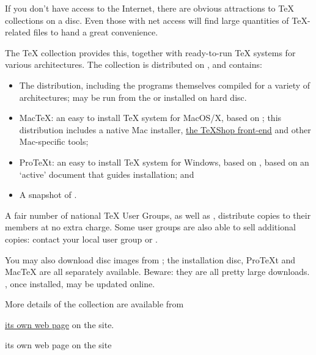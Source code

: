 
If you don't have access to the Internet, there are obvious
attractions to \TeX{} collections on a disc.  Even those with net
access will find large quantities of \TeX{}-related files to hand a
great convenience.

The \TeX{} collection provides this, together with
ready-to-run \TeX{} systems for various architectures.  The collection
is distributed on , and contains:
\begin{itemize}
\item The \texlive{} distribution, including the programs themselves
  compiled for a variety of architectures; \texlive{} may be
  run from the  or installed on hard disc.
\item Mac\TeX{}: an easy to install \TeX{} system for MacOS/X, based
  on \texlive{}; this distribution includes a native Mac installer,
  \href{http://www.uoregon.edu/~koch/texshop/}{the \TeX{}Shop front-end}
  and other Mac-specific tools;
\item Pro\TeX{}t: an easy to install \TeX{} system for Windows, based
  on \miktex{}, based on an `active' document that guides
  installation; and
\item A snapshot of .
\end{itemize}
A fair number of national \TeX{} User Groups, as well as ,
distribute copies to their members at no extra charge.  Some user
groups are also able to sell additional copies:
contact your local user group or .

You may also download disc images from ; the installation
disc, Pro\TeX{}t and Mac\TeX{} are all separately available.  Beware:
they are all pretty large downloads.  \texlive{}, once installed, may
be updated online.

More details of the collection are available from
\begin{hyperversion}
  \href{http://www.tug.org/texcollection/}{its own web page}
  on the  site.
\end{hyperversion}
\begin{flatversion}
  its own web page on the
   site 
\end{flatversion}
\begin{ctanrefs}
\item[Mac\TeX{}]
\item[Pro\TeX{}t]
\item[\texlive{} install image]
\end{ctanrefs}

